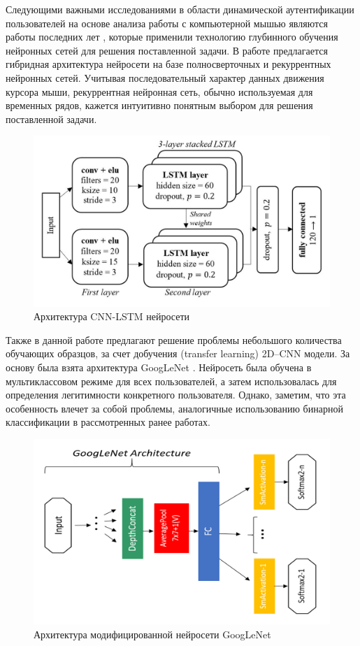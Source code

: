 \documentclass[12pt]{article}
\begin{document}
    \par Следующими важными исследованиями в области динамической аутентификации пользователей на основе анализа работы с компьютерной мышью являются работы последних лет \cite{Chong, Chong2D}, которые применили технологию глубинного обучения нейронных сетей для решения поставленной задачи. В работе предлагается гибридная архитектура нейросети на базе полносверточных и рекуррентных нейронных сетей. Учитывая последовательный характер данных движения курсора мыши, рекуррентная нейронная сеть, обычно используемая для временных рядов, кажется интуитивно понятным выбором для решения поставленной задачи.

    \begin{figure}[h!]
        \centering
        \includegraphics[width=0.58\linewidth]{LSTM+CNN.png}
        \caption{Архитектура CNN-LSTM нейросети}
        \label{sec:Overview:Model:fig:LSTM_CNN}
    \end{figure}

    \par Также в данной работе предлагают решение проблемы небольшого количества обучающих образцов, за счет добучения (transfer learning) 2D--CNN модели. За основу была взята архитектура GoogLeNet \cite{GoogLeNet}. Нейросеть была обучена в мультиклассовом режиме для всех пользователей, а затем использовалась для определения легитимности конкретного пользователя. Однако, заметим, что эта особенность влечет за собой проблемы, аналогичные использованию бинарной классификации в рассмотренных ранее работах.

    \begin{figure}[h!]
        \centering
        \includegraphics[width=0.58\linewidth]{2DCNN.png}
        \caption{Архитектура модифицированной нейросети GoogLeNet}
        \label{sec:Overview:Model:fig:2DCNN}
    \end{figure}
\end{document}
